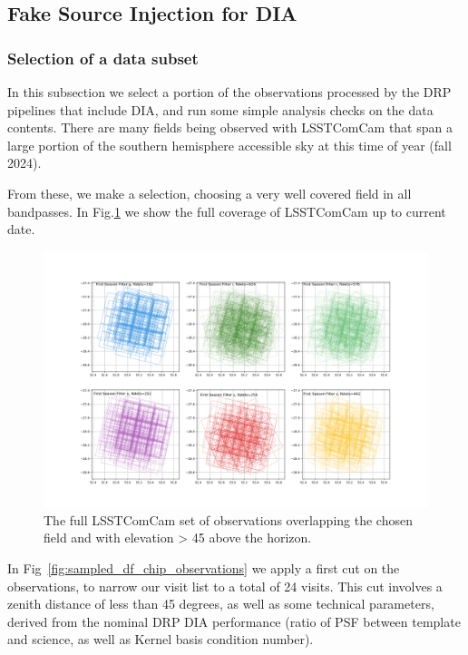 \subsection{Fake Source Injection for DIA}
\subsubsection{Selection of a data subset}

In this subsection we select a portion of the observations processed by the DRP pipelines that include DIA, and run some simple analysis checks on the data contents. There are many fields being observed with LSSTComCam that span a large portion of the southern hemisphere accessible sky at this time of year (fall 2024).

From these, we make a selection, choosing a very well covered field in all bandpasses. In Fig.\ref{fig:deep_df} we show the full coverage of LSSTComCam up to current date.

\begin{figure}
    \centering
    \includegraphics[width=0.95\linewidth]{dia/figures/deep_df_chip_observations.png}
    \caption{The full LSSTComCam set of observations overlapping the chosen field and with elevation > 45 above the horizon.}
    \label{fig:deep_df}
    
\end{figure}

In Fig~\ref{fig:sampled_df_chip_observations} we apply a first cut on the observations, to narrow our visit list to a total of 24 visits. This cut involves a zenith distance of less than 45 degrees, as well as some technical parameters, derived from the nominal DRP DIA performance (ratio of PSF between template and science, as well as Kernel basis condition number). 

